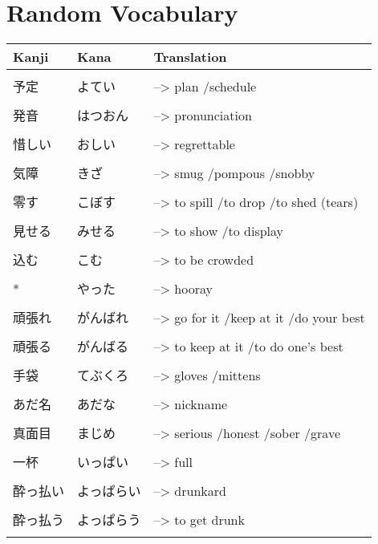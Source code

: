 \documentclass{article}
\begin{document}
\part*{Random Vocabulary}
\begin{tabular}{ l | l l }
Kanji&Kana&Translation\\ \hline\\[-1em]
予定				& よてい					&--> plan /schedule 						\\ \hline\\[-1em]
発音				& はつおん					&--> pronunciation 							\\ \hline\\[-1em]
惜しい			& おしい					&--> regrettable 							\\ \hline\\[-1em]
気障				& きざ 					&--> smug /pompous /snobby					\\ \hline\\[-1em]
零す				& こぼす					&--> to spill /to drop /to shed (tears)		\\ \hline\\[-1em]
見せる			& みせる					&--> to show /to display					\\ \hline\\[-1em]
込む				& こむ					&--> to be crowded							\\ \hline\\[-1em]
*				& やった					&--> hooray									\\ \hline\\[-1em]
頑張れ			& がんばれ					&--> go for it /keep at it /do your best	\\ \hline\\[-1em]
頑張る			& がんばる 				&--> to keep at it /to do one's best		\\ \hline\\[-1em]
手袋				& てぶくろ					&--> gloves /mittens						\\ \hline\\[-1em]
あだ名			& あだな					&--> nickname								\\ \hline\\[-1em]
真面目			& まじめ					&--> serious /honest /sober /grave			\\ \hline\\[-1em]
一杯				& いっぱい					&--> full									\\ \hline\\[-1em]
酔っ払い			& よっぱらい				&--> drunkard								\\ \hline\\[-1em]
酔っ払う			& よっぱらう					&--> to get drunk							\\ \hline\\[-1em]

\end{tabular}
\end{document}
